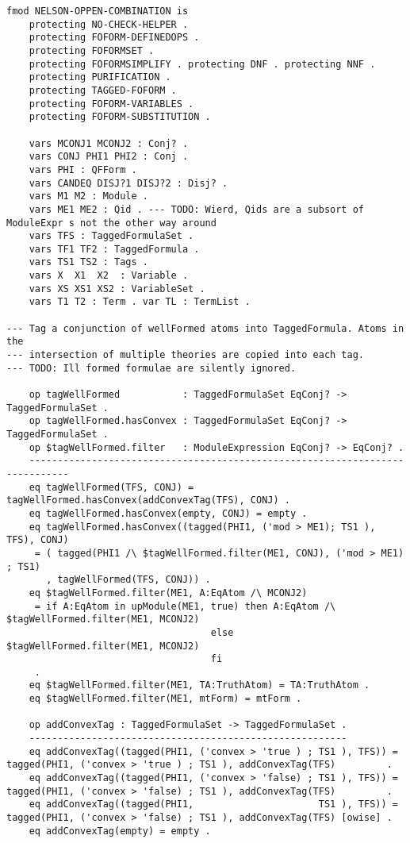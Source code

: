 \documentclass[]{article}
\begin{document}
\begin{verbatim}
fmod NELSON-OPPEN-COMBINATION is
    protecting NO-CHECK-HELPER .
    protecting FOFORM-DEFINEDOPS .
    protecting FOFORMSET .
    protecting FOFORMSIMPLIFY . protecting DNF . protecting NNF .
    protecting PURIFICATION .
    protecting TAGGED-FOFORM .
    protecting FOFORM-VARIABLES .
    protecting FOFORM-SUBSTITUTION .

    vars MCONJ1 MCONJ2 : Conj? .
    vars CONJ PHI1 PHI2 : Conj .
    vars PHI : QFForm .
    vars CANDEQ DISJ?1 DISJ?2 : Disj? .
    vars M1 M2 : Module .
    vars ME1 ME2 : Qid . --- TODO: Wierd, Qids are a subsort of ModuleExpr s not the other way around
    vars TFS : TaggedFormulaSet .
    vars TF1 TF2 : TaggedFormula .
    vars TS1 TS2 : Tags .
    vars X  X1  X2  : Variable .
    vars XS XS1 XS2 : VariableSet .
    vars T1 T2 : Term . var TL : TermList .

--- Tag a conjunction of wellFormed atoms into TaggedFormula. Atoms in the
--- intersection of multiple theories are copied into each tag.
--- TODO: Ill formed formulae are silently ignored.

    op tagWellFormed           : TaggedFormulaSet EqConj? -> TaggedFormulaSet .
    op tagWellFormed.hasConvex : TaggedFormulaSet EqConj? -> TaggedFormulaSet .
    op $tagWellFormed.filter   : ModuleExpression EqConj? -> EqConj? .
    -----------------------------------------------------------------------------
    eq tagWellFormed(TFS, CONJ) = tagWellFormed.hasConvex(addConvexTag(TFS), CONJ) .
    eq tagWellFormed.hasConvex(empty, CONJ) = empty .
    eq tagWellFormed.hasConvex((tagged(PHI1, ('mod > ME1); TS1 ), TFS), CONJ)
     = ( tagged(PHI1 /\ $tagWellFormed.filter(ME1, CONJ), ('mod > ME1) ; TS1)
       , tagWellFormed(TFS, CONJ)) .
    eq $tagWellFormed.filter(ME1, A:EqAtom /\ MCONJ2)
     = if A:EqAtom in upModule(ME1, true) then A:EqAtom /\ $tagWellFormed.filter(ME1, MCONJ2)
                                    else             $tagWellFormed.filter(ME1, MCONJ2)
                                    fi
     .
    eq $tagWellFormed.filter(ME1, TA:TruthAtom) = TA:TruthAtom .
    eq $tagWellFormed.filter(ME1, mtForm) = mtForm .

    op addConvexTag : TaggedFormulaSet -> TaggedFormulaSet .
    --------------------------------------------------------
    eq addConvexTag((tagged(PHI1, ('convex > 'true ) ; TS1 ), TFS)) = tagged(PHI1, ('convex > 'true ) ; TS1 ), addConvexTag(TFS)         .
    eq addConvexTag((tagged(PHI1, ('convex > 'false) ; TS1 ), TFS)) = tagged(PHI1, ('convex > 'false) ; TS1 ), addConvexTag(TFS)         .
    eq addConvexTag((tagged(PHI1,                      TS1 ), TFS)) = tagged(PHI1, ('convex > 'false) ; TS1 ), addConvexTag(TFS) [owise] .
    eq addConvexTag(empty) = empty .


\end{verbatim}
\end{document}
